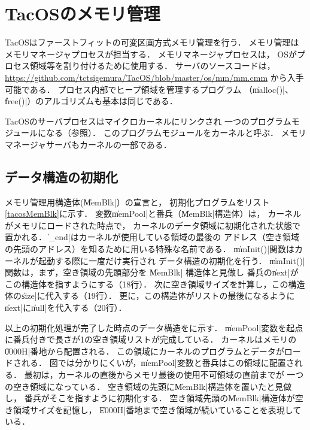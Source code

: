 \chapter{TacOSのメモリ管理}
\label{tacosMalloc}
TacOSはファーストフィットの可変区画方式メモリ管理を行う．
メモリ管理はメモリマネージャプロセスが担当する．
メモリマネージャプロセスは，
OSがプロセス領域等を割り付けるために使用する．
サーバのソースコードは，
\url{https://github.com/tctsigemura/TacOS/blob/master/os/mm/mm.cmm}
から入手可能である．
プロセス内部でヒープ領域を管理するプログラム
（\|malloc()|、\|free()|）のアルゴリズムも基本は同じである．

TacOSのサーバプロセスはマイクロカーネルにリンクされ
一つのプログラムモジュールになる（参照）．
このプログラムモジュールをカーネルと呼ぶ．
メモリマネージャサーバもカーネルの一部である．

\section{データ構造の初期化}
メモリ管理用構造体(\|MemBlk|）の宣言と，
初期化プログラムをリスト\ref{tacosMemBlk}に示す．
変数\|memPool|と番兵（\|MemBlk|構造体）は，
カーネルがメモリにロードされた時点で，
カーネルのデータ領域に初期化された状態で置かれる．
\|_end|はカーネルが使用している領域の最後の
アドレス（空き領域の先頭のアドレス）を知るために用いる特殊な名前である．
\|mmInit()|関数はカーネルが起動する際に一度だけ実行され
データ構造の初期化を行う．
\|mmInit()|関数は，まず，空き領域の先頭部分を \|MemBlk| 構造体と見做し
番兵の\|next|がこの構造体を指すようにする（18行）．
次に空き領域サイズを計算し，この構造体の\|size|に代入する（19行）．
更に，この構造体がリストの最後になるように
\|next|に\|null|を代入する（20行）．



以上の初期化処理が完了した時点のデータ構造をに示す．
\|memPool|変数を起点に番兵付きで長さが1の空き領域リストが完成している．
カーネルはメモリの\|0000H|番地から配置される．
この領域にカーネルのプログラムとデータがロードされる．
図では分かりにくいが，\|memPool|変数と番兵はこの領域に配置される．
最初は，カーネルの直後からメモリ最後の使用不可領域の直前までが
一つの空き領域になっている．
空き領域の先頭に\|MemBlk|構造体を置いたと見做し，
番兵がそこを指すように初期化する．
空き領域先頭の\|MemBlk|構造体が空き領域サイズを記憶し，
\|E000H|番地まで空き領域が続いていることを表現している．

